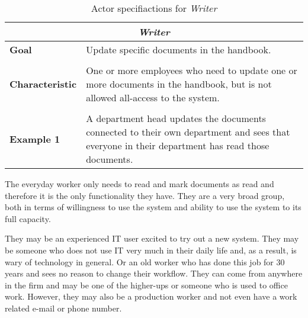 \begin{table}[H]
	\begin{tabular}{l p{11.3cm}}
		\hline
		\multicolumn{2}{c}{\textbf{\textit{Writer}}}\\
		\hline

		\textbf{Goal} & Update specific documents in the handbook. \\
	 	 &  \\

		\textbf{Characteristic} &  One or more employees who need to update one or more documents in the handbook, but is not allowed all-access to the system. \\
		 &  \\

		\textbf{Example 1}
		& A department head updates the documents connected to their own department and sees that everyone in their department has read those documents.\\

		\hline
	\end{tabular}
	\caption{Actor specifiactions for \textit{Writer}}\label{tab:Actor-write}
\end{table}

The everyday worker only needs to read and mark documents as read and therefore it is the only functionality they have.
They are a very broad group, both in terms of willingness to use the system and ability to use the system to its full capacity.

They may be an experienced IT user excited to try out a new system.
They may be someone who does not use IT very much in their daily life and, as a result, is wary of technology in general.
Or an old worker who has done this job for 30 years and sees no reason to change their workflow.
They can come from anywhere in the firm and may be one of the higher-ups or someone who is used to office work.
However, they may also be a production worker and not even have a work related e-mail or phone number.

